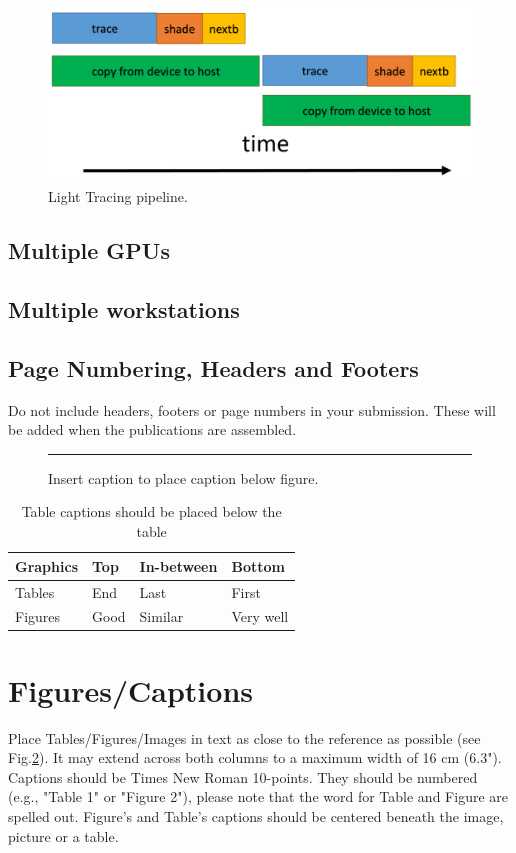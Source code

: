 \documentclass[twoside,twocolumn,10pt]{article}
\begin{document}
\begin{figure}[htb]
	\centering
	\includegraphics[width=1.0\linewidth]{images/pipeline2.png}
	\caption{Light Tracing pipeline.}
	\label{fig:box4}
\end{figure}


\subsection{Multiple GPUs}

\subsection{Multiple workstations}

\subsection*{Page Numbering, Headers and Footers}
Do not include headers, footers or page numbers in your submission. These will be added when the publications are assembled.

\begin{figure}[htb]
    \centering
    \rule{6cm}{3cm}
    \caption{Insert caption to place caption below figure.}
    \label{fig:box}
\end{figure}

\begin{table}[htb]
	\centering
	\begin{tabular}{|l|l|l|l|}
	\hline
	Graphics & Top & In-between & Bottom \\
	\hline
	Tables & End & Last & First \\
	\hline
	Figures & Good & Similar & Very well \\
	\hline
	\end{tabular}
	\caption{Table captions should be placed below the table}
\end{table}

\section{Figures/Captions}
Place Tables/Figures/Images in text as close to the reference as possible (see Fig.\ref{fig:box}). It may extend across both columns to a maximum width of 16 cm (6.3"). Captions should be Times New Roman 10-points.  They should be numbered (e.g., "Table 1" or "Figure 2"), please note that the word for Table and Figure are spelled out. Figure's and Table's captions should be centered beneath the image, picture or a table.
\end{document}
